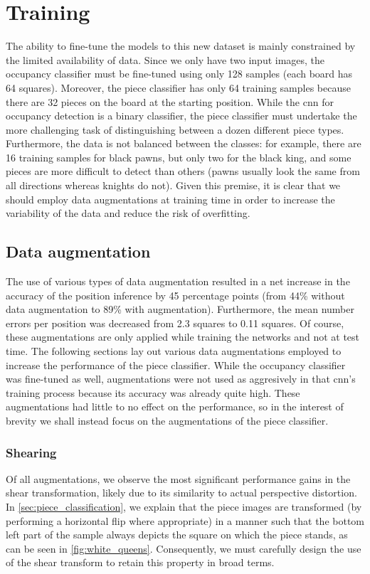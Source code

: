 \documentclass[../report.tex]{subfiles}
\begin{document}
\section{Training}
The ability to fine-tune the models to this new dataset is mainly constrained by the limited availability of data.
Since we only have two input images, the occupancy classifier must be fine-tuned using only 128 samples (each board has 64 squares).
Moreover, the piece classifier has only 64 training samples because there are 32 pieces on the board at the starting position.
While the \gls{cnn} for occupancy detection is a binary classifier, the piece classifier must undertake the more challenging task of distinguishing between a dozen different piece types.
Furthermore, the data is not balanced between the classes: for example, there are 16 training samples for black pawns, but only two for the black king, and some pieces are more difficult to detect than others (pawns usually look the same from all directions whereas knights do not).
Given this premise, it is clear that we should employ data augmentations at training time in order to increase the variability of the data and reduce the risk of overfitting.

\subsection{Data augmentation}
The use of various types of data augmentation resulted in a net increase in the accuracy of the position inference by 45 percentage points (from 44\% without data augmentation to 89\% with augmentation).
Furthermore, the mean number errors per position was decreased from 2.3 squares to 0.11 squares.
Of course, these augmentations are only applied while training the networks and not at test time.
The following sections lay out various data augmentations employed to increase the performance of the piece classifier.
While the occupancy classifier was fine-tuned as well, augmentations were not used as aggresively in that \gls{cnn}'s training process because its accuracy was already quite high.
These augmentations had little to no effect on the performance, so in the interest of brevity we shall instead focus on the augmentations of the piece classifier.

\subsubsection{Shearing}
Of all augmentations, we observe the most significant performance gains in the shear transformation, likely due to its similarity to actual perspective distortion.
In \cref{sec:piece_classification}, we explain that the piece images are transformed (by performing a horizontal flip where appropriate) in a manner such that the bottom left part of the sample always depicts the square on which the piece stands, as can be seen in \cref{fig:white_queens}.
Consequently, we must carefully design the use of the shear transform to retain this property in broad terms.
\end{document}
